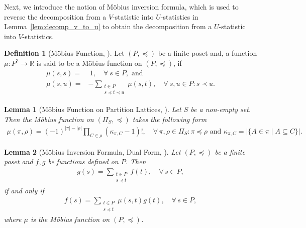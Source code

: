 \documentclass[sn-mathphys, natbib=false]{sn-jnl}
\theoremstyle{plain}
\newtheorem{lemma}{Lemma}
\theoremstyle{definition}
\newtheorem{definition}{Definition}
\newcommand{\mobius}{M\"obius}
\newcommand{\sPi}{\pi}
\newcommand{\partition}{\Pi}
\newcommand{\partitionp}[1]{\partition_{#1}}
\newcommand{\pleq}{\preceq}
\newcommand{\reals}{{\mathbb{R}}}
\begin{document}
\begin{bibunit}[agsm]
Next, we introduce the notion of \mobius{} inversion formula, which is used to reverse the decomposition from a $V$-statistic into $U$-statistics in Lemma~\ref{lem:decomp_v_to_u} to obtain the decomposition from a $U$-statistic into $V$-statistics.

\begin{definition}[\mobius{} Function, \cite{stanley2011enumerative}]\label{def:mobius_func}
    Let $(P, \preceq)$ be a finite poset and, a function $\mu: P^2 \to \reals$ is said to be a \mobius{} function on $(P, \preceq)$, if
    \begin{align*}
        \mu(s,s) = & \ 1, \quad \forall \ s \in P, \text{ and} \\
        \mu(s,u) = & - \sum_{\substack{t \in P \\ s \preceq t \prec u}} \mu(s,t), \quad \forall \ s, u \in P: s \prec u.
    \end{align*}
\end{definition}

\begin{lemma}[\mobius{} Function on Partition Lattices, \cite{stanley2011enumerative}]\label{lem:mobius_func_partition}
Let $S$ be a non-empty set. Then the \mobius{} function on $(\partitionp{S}, \pleq)$ takes the following form
\begin{align*}
    \mu(\sPi, \rho) = (-1)^{|\sPi|-|\rho|} \prod_{C \in \rho} (\kappa_{\sPi, C} - 1)!, \quad \forall \, \sPi,\rho \in \partitionp{S}: \sPi \pleq \rho \text{ and } \kappa_{\sPi, C} = |\{ A \in \sPi \mid A \subseteq C \}|.
\end{align*}
\end{lemma}

\begin{lemma}[\mobius{} Inversion Formula, Dual Form,  \cite{stanley2011enumerative}]\label{lem:mobius_formula_dual}
    Let $(P, \preceq)$ be a finite poset and $f, g$ be functions defined on $P$. Then
    \begin{align*}
        g(s) = \sum_{\substack{t \in P \\ s \preceq t}}f(t), \quad \forall \, s \in P,
    \end{align*}
    if and only if
    \begin{align*}
        f(s) = \sum_{\substack{t \in P \\ s \preceq t}} \mu(s,t)g(t), \quad \forall \, s \in P, 
    \end{align*}
    where $\mu$ is the \mobius{} function on $(P, \preceq)$. 
\end{lemma}


\end{bibunit}
\end{document}
